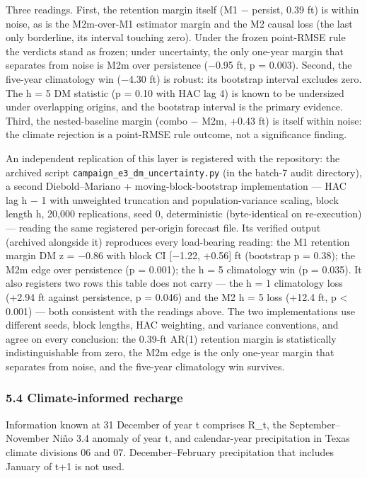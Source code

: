 \documentclass[11pt]{article}
\begin{document}
Three readings. First, the retention margin itself (M1 \ensuremath{-} persist, 0.39
ft) is within noise, as is the M2m-over-M1 estimator margin and the M2
causal loss (the last only borderline, its interval touching zero).
Under the frozen point-RMSE rule the verdicts stand as frozen; under
uncertainty, the only one-year margin that separates from noise is M2m
over persistence (\ensuremath{-}0.95 ft, p = 0.003). Second, the five-year
climatology win (\ensuremath{-}4.30 ft) is robust: its bootstrap interval excludes
zero. The h = 5 DM statistic (p = 0.10 with HAC lag 4) is known to be
undersized under overlapping origins, and the bootstrap interval is the
primary evidence. Third, the nested-baseline margin (combo \ensuremath{-} M2m, +0.43
ft) is itself within noise: the climate rejection is a point-RMSE rule
outcome, not a significance finding.

An independent replication of this layer is registered with the
repository: the archived script
\texttt{campaign\_e3\_dm\_uncertainty.py} (in the batch-7 audit
directory), a second Diebold--Mariano + moving-block-bootstrap
implementation --- HAC lag h \ensuremath{-} 1 with unweighted truncation and
population-variance scaling, block length h, 20,000 replications, seed
0, deterministic (byte-identical on re-execution) --- reading the same
registered per-origin forecast file. Its verified output (archived
alongside it) reproduces every load-bearing reading: the M1 retention
margin DM z = \ensuremath{-}0.86 with block CI {[}\ensuremath{-}1.22, +0.56{]} ft (bootstrap p =
0.38); the M2m edge over persistence (p = 0.001); the h = 5 climatology
win (p = 0.035). It also registers two rows this table does not carry
--- the h = 1 climatology loss (+2.94 ft against persistence, p = 0.046)
and the M2 h = 5 loss (+12.4 ft, p \textless{} 0.001) --- both
consistent with the readings above. The two implementations use
different seeds, block lengths, HAC weighting, and variance conventions,
and agree on every conclusion: the 0.39-ft AR(1) retention margin is
statistically indistinguishable from zero, the M2m edge is the only
one-year margin that separates from noise, and the five-year climatology
win survives.

\subsubsection{5.4 Climate-informed
recharge}\label{climate-informed-recharge}

Information known at 31 December of year t comprises R\_t, the
September--November Ni\~no 3.4 anomaly of year t, and calendar-year
precipitation in Texas climate divisions 06 and 07. December--February
precipitation that includes January of t+1 is not used.
\end{document}
